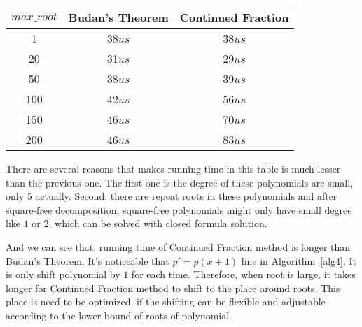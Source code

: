 \begin{center}
\label{tb3}
\begin{tabular}{ |c|c|c| } 
 \hline

 $max\_root$  & Budan's Theorem & Continued Fraction\\ 

 \hline
 1   & 38$us$  & 38$us$\\ 
 20   & 31$us$  & 29$us$\\ 
 50   & 38$us$  & 39$us$\\ 
 100   & 42$us$  & 56$us$\\ 
 150   & 46$us$  & 70$us$\\ 
 200   & 46$us$  & 83$us$\\ 
 \hline
\end{tabular}
\end{center}

There are several reasons that makes running time in this table is much lesser
than the previous one. The first one is the degree of these polynomials are
small, only 5 actually. Second, there are repeat roots in these polynomials and
after square-free decomposition, square-free polynomials might only have small
degree like $1$ or $2$, which can be solved with closed formula solution.

And we can see that, running time of Continued Fraction method is longer than
Budan's Theorem. It's noticeable that $p'=p(x+1)$ line in Algorithm~\ref{alg4}.
It is only shift polynomial by $1$ for each time. Therefore, when root is large,
it takes longer for Continued Fraction method to shift to the place around
roots. This place is need to be optimized, if the shifting can be flexible and
adjustable according to the lower bound of roots of polynomial.


